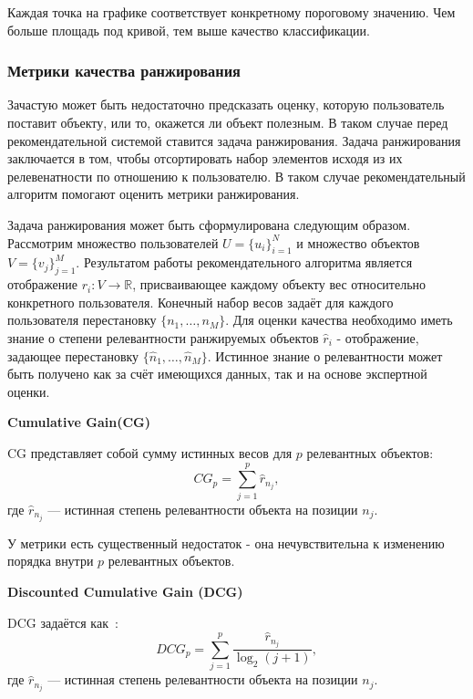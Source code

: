 Каждая точка на графике соответствует конкретному пороговому значению.
Чем больше площадь под кривой, тем выше качество классификации.


\subsubsection{Метрики качества ранжирования}
Зачастую может быть недостаточно предсказать оценку, которую пользователь поставит объекту, или то, окажется ли объект полезным.
В таком случае перед рекомендательной системой ставится задача ранжирования.
Задача ранжирования заключается в том, чтобы отсортировать набор элементов исходя из их релевенатности по отношению к пользователю.
В таком случае рекомендательный алгоритм помогают оценить метрики ранжирования.

Задача ранжирования может быть сформулирована следующим образом.
Рассмотрим множество пользователей $U = \{u_i\}_{i=1}^{N}$ и множество объектов $V = \{v_j\}_{j=1}^{M}$.
Результатом работы рекомендательного алгоритма является отображение $r_i: V \to \mathbb{R}$, присваивающее каждому объекту вес относительно конкретного пользователя.
Конечный набор весов задаёт для каждого пользователя перестановку $\{n_1, \dots, n_M\}$.
Для оценки качества необходимо иметь знание о степени релевантности ранжируемых объектов $\hat{r}_i$ - отображение, задающее перестановку $\{\hat{n}_1, \dots, \hat{n}_M\}$.
Истинное знание о релевантности может быть получено как за счёт имеющихся данных, так и на основе экспертной оценки.

\vspace{1em}
\textbf{Cumulative Gain(CG)}

CG представляет собой сумму истинных весов для $p$ релевантных объектов:
\begin{equation}\label{eq:cg}
CG_p = \sum_{j=1}^{p}\hat{r}_{n_j},
\end{equation}
где $\hat{r}_{n_j}$ --- истинная степень релевантности объекта на позиции $n_j$.

У метрики есть существенный недостаток - она нечувствительна к изменению порядка внутри $p$ релевантных объектов.

\vspace{1em}
\textbf{Discounted Cumulative Gain (DCG)}

DCG задаётся как~\cite{dcg}:
\begin{equation}\label{eq:dcg}
DCG_p = \sum_{j=1}^{p}\frac{\hat{r}_{n_j}}{\log_2 (j + 1)},
\end{equation}
где $\hat{r}_{n_j}$ --- истинная степень релевантности объекта на позиции $n_j$.


